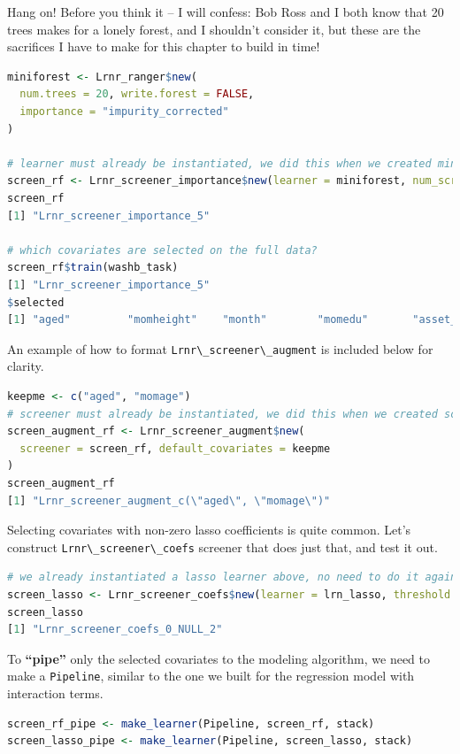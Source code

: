 \documentclass[12pt, krantz2,]{krantz}
\newcommand{\passthrough}[1]{#1}
\theoremstyle{definition}
\theoremstyle{definition}
\theoremstyle{definition}
\newcommand{\1}{\mathbbm{1}}
\begin{document}
Hang on! Before you think it -- I will confess: Bob Ross and I both know that 20
trees makes for a lonely forest, and I shouldn't consider it, but these are the
sacrifices I have to make for this chapter to build in time!

\begin{lstlisting}[language=R]
miniforest <- Lrnr_ranger$new(
  num.trees = 20, write.forest = FALSE,
  importance = "impurity_corrected"
)

# learner must already be instantiated, we did this when we created miniforest
screen_rf <- Lrnr_screener_importance$new(learner = miniforest, num_screen = 5)
screen_rf
[1] "Lrnr_screener_importance_5"

# which covariates are selected on the full data?
screen_rf$train(washb_task)
[1] "Lrnr_screener_importance_5"
$selected
[1] "aged"         "momheight"    "month"        "momedu"       "asset_refrig"
\end{lstlisting}

An example of how to format \passthrough{\lstinline!Lrnr\_screener\_augment!} is included below for
clarity.

\begin{lstlisting}[language=R]
keepme <- c("aged", "momage")
# screener must already be instantiated, we did this when we created screen_rf
screen_augment_rf <- Lrnr_screener_augment$new(
  screener = screen_rf, default_covariates = keepme
)
screen_augment_rf
[1] "Lrnr_screener_augment_c(\"aged\", \"momage\")"
\end{lstlisting}

Selecting covariates with non-zero lasso coefficients is quite common. Let's
construct \passthrough{\lstinline!Lrnr\_screener\_coefs!} screener that does just that, and test it out.

\begin{lstlisting}[language=R]
# we already instantiated a lasso learner above, no need to do it again
screen_lasso <- Lrnr_screener_coefs$new(learner = lrn_lasso, threshold = 0)
screen_lasso
[1] "Lrnr_screener_coefs_0_NULL_2"
\end{lstlisting}

To \textbf{``pipe''} only the selected covariates to the modeling algorithm, we need to
make a \passthrough{\lstinline!Pipeline!}, similar to the one we built for the regression model with
interaction terms.

\begin{lstlisting}[language=R]
screen_rf_pipe <- make_learner(Pipeline, screen_rf, stack)
screen_lasso_pipe <- make_learner(Pipeline, screen_lasso, stack)
\end{lstlisting}
\end{document}
